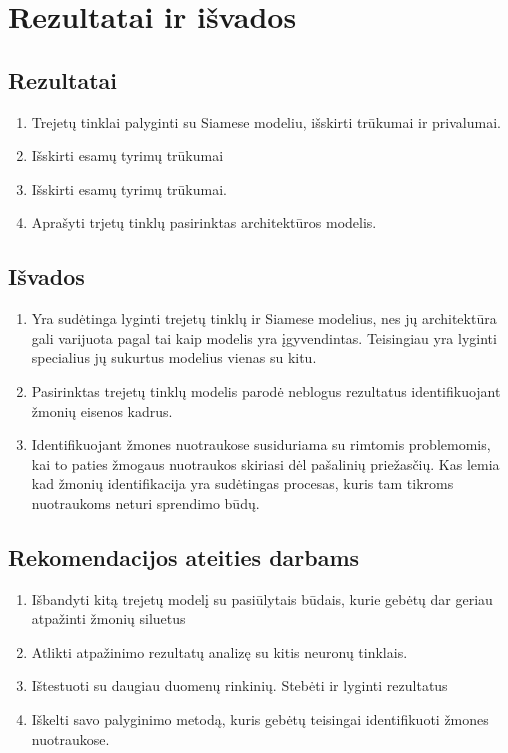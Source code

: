 \documentclass{VUMIFPSkursinis}
\begin{document}
\section{Rezultatai ir išvados}
\thispagestyle{empty} 
\subsection{Rezultatai}
\begin{enumerate}
\item{Trejetų tinklai palyginti su Siamese modeliu, išskirti trūkumai ir privalumai.}
\item{Išskirti esamų tyrimų trūkumai}
\item{Išskirti esamų tyrimų trūkumai.}
\item{Aprašyti trjetų tinklų pasirinktas architektūros modelis.}
\end{enumerate}
\subsection{Išvados}
\begin{enumerate}
\item{Yra sudėtinga lyginti trejetų tinklų ir Siamese modelius, nes jų architektūra gali varijuota pagal tai kaip modelis yra įgyvendintas. Teisingiau yra lyginti specialius jų sukurtus modelius vienas su kitu.}
\item{Pasirinktas trejetų tinklų modelis parodė neblogus rezultatus identifikuojant žmonių eisenos kadrus.}
\item{Identifikuojant žmones nuotraukose susiduriama su rimtomis problemomis, kai to paties žmogaus nuotraukos skiriasi dėl pašalinių priežasčių. Kas lemia kad žmonių identifikacija yra sudėtingas procesas, kuris tam tikroms nuotraukoms neturi sprendimo būdų.}
\end{enumerate}
\subsection{Rekomendacijos ateities darbams}
\begin{enumerate}
\item{Išbandyti kitą trejetų modelį su pasiūlytais būdais, kurie gebėtų dar geriau atpažinti žmonių siluetus}
\item{Atlikti atpažinimo rezultatų analizę su kitis neuronų tinklais.}
\item{Ištestuoti su daugiau duomenų rinkinių. Stebėti ir lyginti rezultatus}
\item{Iškelti savo palyginimo metodą, kuris gebėtų teisingai identifikuoti žmones nuotraukose.}
\end{enumerate}
\pagebreak
\end{document}
